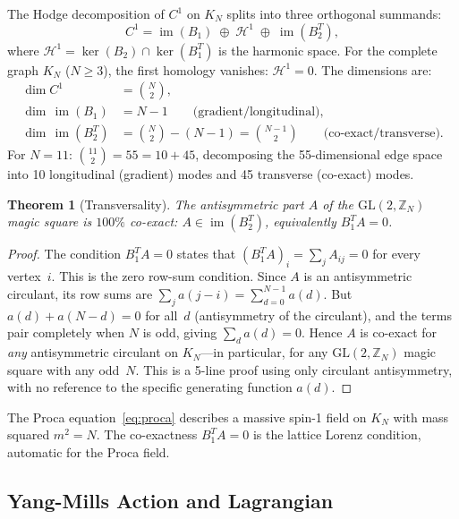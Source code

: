 \documentclass[aip,jmp,reprint,superscriptaddress,floatfix,nofootinbib]{revtex4-2}
\newtheorem{theorem}{Theorem}
\theoremstyle{definition}
\theoremstyle{remark}
\newcommand{\ZN}{\mathbb{Z}_N}
\newcommand{\GL}{\mathrm{GL}}
\begin{document}
The Hodge decomposition of $C^1$ on $K_N$ splits into three
orthogonal summands:
\begin{equation}\label{eq:hodge}
C^1 = \operatorname{im}(B_1) \;\oplus\; \mathcal{H}^1
       \;\oplus\; \operatorname{im}(B_2^T),
\end{equation}
where $\mathcal{H}^1 = \ker(B_2) \cap \ker(B_1^T)$ is the harmonic
space.  For the complete graph $K_N$ ($N \ge 3$), the first homology
vanishes: $\mathcal{H}^1 = 0$.  The dimensions are:
\begin{align}
\dim C^1 &= \binom{N}{2}, \\
\dim\,\operatorname{im}(B_1) &= N - 1 \qquad
  \text{(gradient/longitudinal)}, \\
\dim\,\operatorname{im}(B_2^T) &= \binom{N}{2} - (N-1) = \binom{N{-}1}{2}
  \qquad \text{(co-exact/transverse)}.
\end{align}
For $N = 11$: $\binom{11}{2} = 55 = 10 + 45$, decomposing the
55-dimensional edge space into 10 longitudinal (gradient) modes and
45 transverse (co-exact) modes.

\begin{theorem}[Transversality]\label{thm:transverse}
The antisymmetric part $A$ of the $\GL(2,\ZN)$ magic square is
$100\%$ co-exact: $A \in \operatorname{im}(B_2^T)$, equivalently
$B_1^T A = 0$.
\end{theorem}

\begin{proof}
The condition $B_1^T A = 0$ states that $(B_1^T A)_i =
\sum_{j} A_{ij} = 0$ for every vertex~$i$.  This is the zero row-sum
condition.  Since $A$ is an antisymmetric circulant, its row sums are
$\sum_{j} a(j{-}i) = \sum_{d=0}^{N-1} a(d)$.  But $a(d) + a(N{-}d) = 0$
for all~$d$ (antisymmetry of the circulant), and the terms pair
completely when $N$ is odd, giving
$\sum_d a(d) = 0$.  Hence $A$ is co-exact for \emph{any}
antisymmetric circulant on $K_N$---in particular, for any $\GL(2,\ZN)$
magic square with any odd~$N$.  This is a 5-line proof using only
circulant antisymmetry, with no reference to the specific generating
function $a(d)$.
\end{proof}

The Proca equation~\eqref{eq:proca} describes a massive spin-1 field
on $K_N$ with mass squared $m^2 = N$.  The co-exactness
$B_1^T A = 0$ is the lattice Lorenz condition, automatic for the
Proca field.

\subsection{Yang-Mills Action and Lagrangian}
\label{sec:proca:virial}
\end{document}
